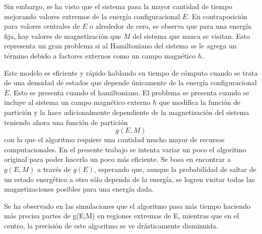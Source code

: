 \documentclass[12pt]{book}
\begin{document}
Sin embargo, se ha visto que el sistema pasa la mayor cantidad de tiempo mejorando  valores extremos de la energía configuracional $E$. En contraposición para valores centrales de $E$ o alrededor de cero, se observa que para una energía fija, hay valores de magnetización que $M$ del sistema que nunca se visitan. Esto representa un gran problema si al Hamiltoniano del sistema se le agrega un término debido a factores externos como un campo magnético $h$.


Este modelo es eficiente y rápido hablando en tiempo de cómputo cuando se trata de una densidad de estados que depende únicamente de la energía configuracional $E$. Esto se presenta cuando el hamiltoniano. El problema se presenta cuando se incluye al sistema un campo magnético externo $h$ que modifica la función de partición y la hace adicionalmente dependiente de la magnetización del sistema teniendo ahora una función de partición 
\begin{equation}
g(E,M)
\end{equation}
con la que el algoritmo  requiere una cantidad mucho mayor de recursos computacionales. En el presente trabajo se intenta variar un poco el algoritmo original para poder hacerlo un poco más eficiente. Se basa en encontrar a $g(E,M)$ a través de $g(E)$, esperando que, aunque la probabilidad de saltar  de un estado energético a otro sólo dependa de la energía, se logren visitar todas las magnetizaciones posibles para una energía dada.

Se ha observado en las simulaciones que el algoritmo pasa más tiempo haciendo más precisa partes de g(E,M) en regiones extremas de E, mientras que en el centro, la precisión de este algoritmo se ve drásticamente disminuida.
\end{document}
